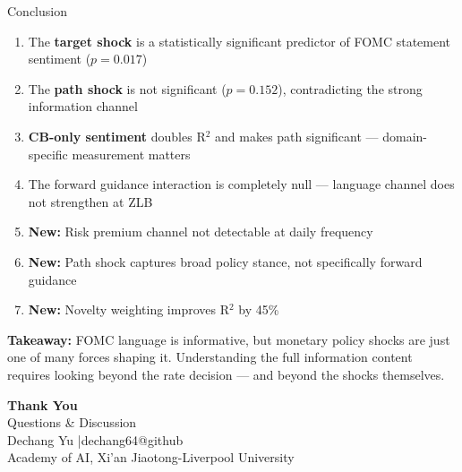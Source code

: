 \documentclass[aspectratio=169, 11pt]{beamer}
\begin{document}
\begin{frame}{Conclusion}
\begin{enumerate}
  \item The \textbf{target shock} is a statistically significant predictor of FOMC statement sentiment ($p = 0.017$)
  \item The \textbf{path shock} is \alert{not} significant ($p = 0.152$), contradicting the strong information channel
  \item \textbf{CB-only sentiment} doubles R$^2$ and makes path significant --- domain-specific measurement matters
  \item The forward guidance interaction is \alert{completely null} --- language channel does not strengthen at ZLB
  \item \textcolor{success}{\textbf{New:}} Risk premium channel not detectable at daily frequency
  \item \textcolor{success}{\textbf{New:}} Path shock captures broad policy stance, not specifically forward guidance
  \item \textcolor{success}{\textbf{New:}} Novelty weighting improves R$^2$ by 45\%
\end{enumerate}

\vspace{0.5em}
\centering
\textbf{Takeaway:} FOMC language is informative, but monetary policy shocks are just one of many forces shaping it. Understanding the full information content requires looking beyond the rate decision --- and beyond the shocks themselves.
\end{frame}

\begin{frame}[plain]
\centering
\vspace{2cm}
{\Huge\bfseries Thank You}\\[1.5em]
{\Large Questions \& Discussion}\\[2em]
{\normalsize Dechang Yu \quad|\quad dechang64@github}\\[0.5em]
{\small Academy of AI, Xi'an Jiaotong-Liverpool University}
\end{frame}

\appendix
\end{document}
